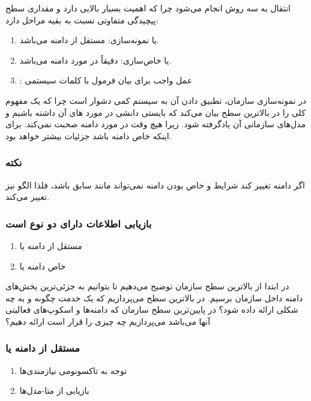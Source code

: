انتقال به سه روش انجام می‌شود چرا که اهمیت بسیار بالایی دارد و مقداری سطح
پیچیدگی متفاوتی نسبت به بقیه مراحل دارد:

\begin{enumerate}
    \item {} یا نمونه‌سازی: مستقل از دامنه می‌باشد.
    \item {} یا خاص‌سازی: دقیقاً در مورد دامنه می‌باشد.
    \item {}: عمل واجب برای بیان فرمول با کلمات سیستمی
\end{enumerate}

در نمونه‌سازی سازمان، تطبیق دادن آن به سیستم کمی دشوار است چرا که یک مفهوم کلی
را در بالاترین سطح بیان می‌کند که بایستی دانشی در مورد های آن
داشته باشیم و مدل‌های سازمانی آن یادگرفته شود. زیرا هیچ وقت در مورد دامنه صحبت
نمی‌کند. برای اینکه خاص دامنه باشد جزئیات بیشتر خواهد بود.

\subsubsection*{نکته}

اگر دامنه تغییر کند شرایط و خاص بودن دامنه نمی‌تواند مانند سابق باشد، فلذا الگو
نیز تغییر می‌کند.

\subsubsection*{بازیابی اطلاعات دارای دو نوع است}

\begin{enumerate}
    \item مستقل از دامنه یا 
    \item خاص دامنه یا 
\end{enumerate}

در ابتدا از بالاترین سطح سازمان توضیح می‌دهیم تا بتوانیم به جزئی‌ترین بخش‌های
دامنه داخل سازمان برسیم. در بالاترین سطح می‌پردازیم که یک خدمت چگونه و به چه
شکلی ارائه داده شود؟ در پایین‌ترین سطح سازمان که دامنه‌ها و اسکوپ‌های فعالیتی
آنها می‌باشد می‌پردازیم چه چیزی را قرار است ارائه دهیم؟

\subsubsection*{مستقل از دامنه یا }

\begin{enumerate}
    \item توجه به تاکسونومی نیازمندی‌ها
    \item بازیابی از متا-مدل‌ها
\end{enumerate}

